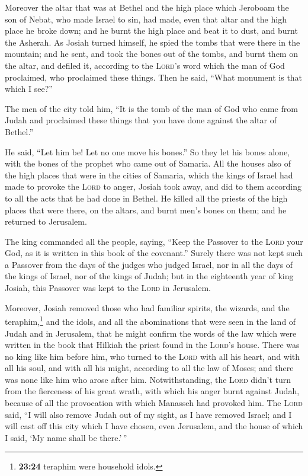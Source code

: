  Moreover the altar that was at Bethel and the high place
which Jeroboam the son of Nebat, who made Israel to sin, had made, even
that altar and the high place he broke down; and he burnt the high place
and beat it to dust, and burnt the Asherah.  As Josiah
turned himself, he spied the tombs that were there in the mountain; and
he sent, and took the bones out of the tombs, and burnt them on the
altar, and defiled it, according to the \textsc{Lord}'s word which the
man of God proclaimed, who proclaimed these things.  Then
he said, ``What monument is that which I see?''

The men of the city told him, ``It is the tomb of the man of God who
came from Judah and proclaimed these things that you have done against
the altar of Bethel.''

 He said, ``Let him be! Let no one move his bones.'' So
they let his bones alone, with the bones of the prophet who came out of
Samaria.  All the houses also of the high places that
were in the cities of Samaria, which the kings of Israel had made to
provoke the \textsc{Lord} to anger, Josiah took away, and did to them
according to all the acts that he had done in Bethel.  He
killed all the priests of the high places that were there, on the
altars, and burnt men's bones on them; and he returned to Jerusalem.

 The king commanded all the people, saying, ``Keep the
Passover to the \textsc{Lord} your God, as it is written in this book of
the covenant.''  Surely there was not kept such a
Passover from the days of the judges who judged Israel, nor in all the
days of the kings of Israel, nor of the kings of Judah; 
but in the eighteenth year of king Josiah, this Passover was kept to the
\textsc{Lord} in Jerusalem.

 Moreover, Josiah removed those who had familiar spirits,
the wizards, and the teraphim,\footnote{\textbf{23:24} teraphim were
  household idols.} and the idols, and all the abominations that were
seen in the land of Judah and in Jerusalem, that he might confirm the
words of the law which were written in the book that Hilkiah the priest
found in the \textsc{Lord}'s house.  There was no king
like him before him, who turned to the \textsc{Lord} with all his heart,
and with all his soul, and with all his might, according to all the law
of Moses; and there was none like him who arose after him.
 Notwithstanding, the \textsc{Lord} didn't turn from the
fierceness of his great wrath, with which his anger burnt against Judah,
because of all the provocation with which Manasseh had provoked him.
 The \textsc{Lord} said, ``I will also remove Judah out
of my sight, as I have removed Israel; and I will cast off this city
which I have chosen, even Jerusalem, and the house of which I said, `My
name shall be there.'\,''

